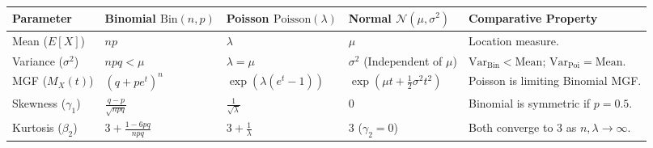 \documentclass[12pt,a4paper]{article}
\renewcommand{\arraystretch}{1.45}
\begin{document}
\vspace{2pt}

\begin{tcolorbox}[tikzbox, title={\textbf{Summary Matrix: Comparison of Binomial, Poisson and Normal Distributions}}]
\par\vspace{1pt}
\begingroup
\setlength{\tabcolsep}{3.5pt}
\setlength{\extrarowheight}{1.0pt}
\renewcommand{\arraystretch}{1.12}
\noindent\begin{tabularx}{\linewidth}{|B{2.5cm}|B{3.2cm}|B{2.2cm}|B{2.5cm}|Y|}
\hline
\textbf{Parameter} & \textbf{Binomial $\text{Bin}(n, p)$} & \textbf{Poisson $\text{Poisson}(\lambda)$} & \textbf{Normal $\mathcal{N}(\mu, \sigma^2)$} & \textbf{Comparative Property} \\
\hline
Mean ($E[X]$) & $np$ & $\lambda$ & $\mu$ & Location measure. \\
\hline
Variance ($\sigma^2$) & $npq < \mu$ & $\lambda = \mu$ & $\sigma^2$ (Independent of $\mu$) & $\text{Var}_{\text{Bin}} < \text{Mean}$; $\text{Var}_{\text{Poi}} = \text{Mean}$. \\
\hline
MGF ($M_X(t)$) & $(q + p e^t)^n$ & $\exp(\lambda(e^t - 1))$ & $\exp(\mu t + \frac{1}{2}\sigma^2 t^2)$ & Poisson is limiting Binomial MGF. \\
\hline
Skewness ($\gamma_1$) & $\frac{q - p}{\sqrt{npq}}$ & $\frac{1}{\sqrt{\lambda}}$ & $0$ & Binomial is symmetric if $p = 0.5$. \\
\hline
Kurtosis ($\beta_2$) & $3 + \frac{1 - 6pq}{npq}$ & $3 + \frac{1}{\lambda}$ & $3$ ($\gamma_2 = 0$) & Both converge to $3$ as $n, \lambda \to \infty$. \\
\hline
\end{tabularx}\par
\endgroup
\end{tcolorbox}
\end{document}
